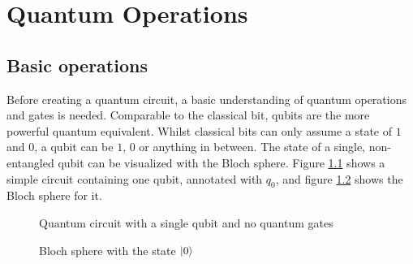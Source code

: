 
\chapter{Quantum Operations} %

\label{Chapter2}

\section{Basic operations}
\label{chapter:basic_opterations}

Before creating a quantum circuit, a basic understanding of quantum operations and gates is needed. Comparable to the classical bit, qubits are the more powerful quantum equivalent. Whilst classical bits can only assume a state of $1$ and $0$, a qubit can be $1$, $0$ or anything in between. The state of a single, non-entangled qubit can be visualized with the Bloch sphere\cite{bloch_nuclear_induction}. Figure \ref{fig:circuit_empty} shows a simple circuit containing one qubit, annotated with $q_0$, and figure \ref{fig:circuit_empty_bloch_sphere} shows the Bloch sphere for it.

\begin{figure}[!h]
    \centering
    \caption{Quantum circuit with a single qubit and no quantum gates}
    \label{fig:circuit_empty}
\end{figure}

\begin{figure}[!h]
    \centering
    \caption{Bloch sphere with the state $\ket{0}$}
    \label{fig:circuit_empty_bloch_sphere}
\end{figure}

